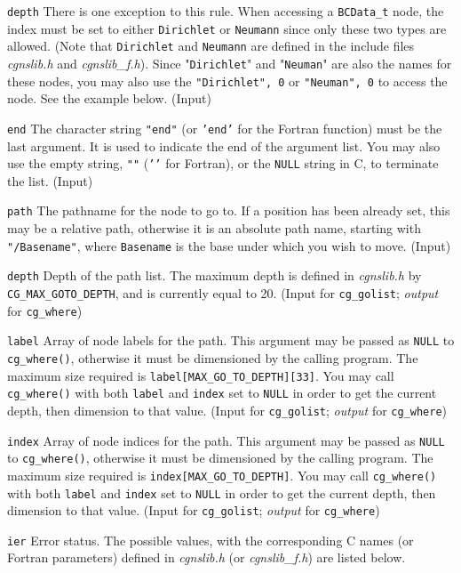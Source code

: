 \begin{Ventryi}{\texttt{depth}}
      There is one exception to this rule.
      When accessing a \texttt{BCData\_t} node, the index must be set to
      either \texttt{Dirichlet} or \texttt{Neumann} since only these
      two types are allowed.
      (Note that \texttt{Dirichlet} and \texttt{Neumann} are defined in
      the include files \textit{cgnslib.h} and \textit{cgnslib\_f.h}).
      Since "\texttt{Dirichlet}" and "\texttt{Neuman}" are also the
      names for these nodes, you may also use the \texttt{"Dirichlet", 0}
      or \texttt{"Neuman", 0} to access the node.
      See the example below.
      (\textcolor{input}{Input})
\item [\texttt{end}]
      The character string \texttt{"end"} (or \texttt{'end'} for the Fortran
      function) must be the last argument.
      It is used to indicate the end of the argument list.
      You may also use the empty string, \texttt{""} (\texttt{{'}{'}} for
      Fortran), or the \texttt{NULL} string in C, to terminate the
      list.
      (\textcolor{input}{Input})
\item [\texttt{path}]
      The pathname for the node to go to.
      If a position has been already set, this may be a relative
      path, otherwise it is an absolute path name, starting with
      \texttt{"/Basename"}, where \texttt{Basename} is the base under
      which you wish to move.
      (\textcolor{input}{Input})
\item [\texttt{depth}]
      Depth of the path list.
      The maximum depth is defined in \textit{cgnslib.h} by
      \texttt{CG\_MAX\_GOTO\_DEPTH}, and is currently equal to 20.
      (\textcolor{input}{Input} for \texttt{cg\_golist};
      \textcolor{output}{\textit{output}} for \texttt{cg\_where})
\item [\texttt{label}]
      Array of node labels for the path.
      This argument may be passed as \texttt{NULL} to
      \texttt{cg\_where()}, otherwise it must be dimensioned by the
      calling program.
      The maximum size required is \texttt{label[MAX\_GO\_TO\_DEPTH][33]}.
      You may call \texttt{cg\_where()} with both \texttt{label} and
      \texttt{index} set to \texttt{NULL} in order to get the current
      depth, then dimension to that value.
      (\textcolor{input}{Input} for \texttt{cg\_golist};
      \textcolor{output}{\textit{output}} for \texttt{cg\_where})
\item [\texttt{index}]
      Array of node indices for the path.
      This argument may be passed as \texttt{NULL} to
      \texttt{cg\_where()}, otherwise it must be dimensioned by the
      calling program.
      The maximum size required is \texttt{index[MAX\_GO\_TO\_DEPTH]}.
      You may call \texttt{cg\_where()} with both \texttt{label} and
      \texttt{index} set to \texttt{NULL} in order to get the current
      depth, then dimension to that value.
      (\textcolor{input}{Input} for \texttt{cg\_golist};
      \textcolor{output}{\textit{output}} for \texttt{cg\_where})
\item [\texttt{ier}]
      Error status.
      The possible values, with the corresponding C names (or Fortran
      parameters) defined in \textit{cgnslib.h} (or \textit{cgnslib\_f.h})
      are listed below.


\end{Ventryi}
